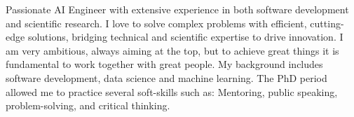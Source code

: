 Passionate AI Engineer with extensive experience in both software development and scientific research. I love to solve complex problems with efficient, cutting-edge solutions, bridging technical and scientific expertise to drive innovation.
I am very ambitious, always aiming at the top, but to achieve great things it is fundamental to work together with great people.
My background includes software development, data science and machine learning.
The PhD period allowed me to practice several soft-skills such as: Mentoring, public speaking, problem-solving, and critical thinking.